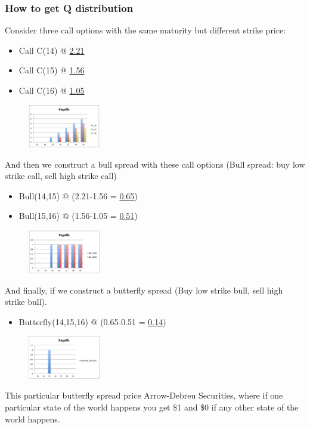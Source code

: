 \begin{multicols}{2}
\subsubsection{How to get Q distribution}
Consider three call options with the same maturity but different strike price:
\begin{itemize}
    \item Call C(14) @ \underline{2.21}
    \item Call C(15) @ \underline{1.56}
    \item Call C(16) @ \underline{1.05}
\end{itemize}
\begin{figure}[H]
    \centering 
    \includegraphics[width =0.28\textwidth]{Figure/Q_call.png}
\end{figure}
And then we construct a bull spread with these call options (Bull spread: buy low strike call, sell high strike call) 
\begin{itemize}
    \item Bull(14,15) @ (2.21-1.56 = \underline{0.65})
    \item Bull(15,16) @ (1.56-1.05 = \underline{0.51})
\end{itemize}
\begin{figure}[H]
    \centering 
    \includegraphics[width =0.28\textwidth]{Figure/Q_bull.png}
\end{figure}
And finally, if we construct a butterfly spread (Buy low strike bull, sell high strike bull). 
\begin{itemize}
    \item Butterfly(14,15,16) @ (0.65-0.51 = \underline{0.14})
\end{itemize}
\begin{figure}[H]
    \centering 
    \includegraphics[width =0.28\textwidth]{Figure/Q_butter.png}
\end{figure}
This particular butterfly spread price Arrow-Debreu Securities, where if one particular state of the world happens you get \$1 and \$0 if any other state of the world happens.\par


\end{multicols}

